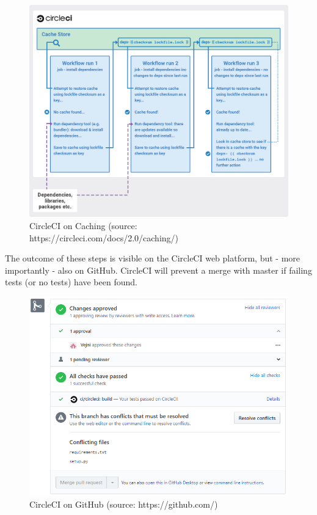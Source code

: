 \documentclass[main.tex]{subfiles}
\begin{document}
 \begin{figure}[H]
   \centering
   \includegraphics[width=\textwidth]{05Coding/05Pictures/cache_CI.png}
   \caption{CircleCI on Caching (source: https://circleci.com/docs/2.0/caching/)}
   \label{cache_CI}
\end{figure}

The outcome of these steps is visible on the CircleCI web platform, but - more importantly - also on GitHub. CircleCI will prevent a merge with master if failing tests (or no tests) have been found.

 \begin{figure}[H]
   \centering
   \includegraphics[scale=0.6]{05Coding/05Pictures/circleCI.png}
   \caption{CircleCI on GitHub (source: https://github.com/)}
   \label{CircleCI}
\end{figure}
\end{document}
